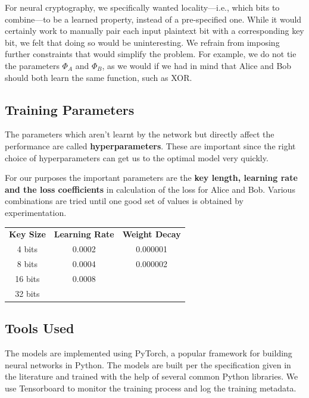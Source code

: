\documentclass[a4paper]{article}
\begin{document}
    For neural cryptography, we specifically wanted locality—i.e., which bits to combine—to
    be a learned property, instead of a pre-specified one. While it would certainly work to manually pair
    each input plaintext bit with a corresponding key bit, we felt that doing so would be uninteresting.
    We refrain from imposing further constraints that would simplify the problem. For example, we do
    not tie the parameters $\Phi_{A}$ and $\Phi_{B}$, as we would if we had in mind that Alice and Bob should both
    learn the same function, such as XOR.

    \subsection{Training Parameters}
    The parameters which aren't learnt by the network but directly affect the performance are
    called {\bfseries hyperparameters}. These are important since the right choice of hyperparameters
    can get us to the optimal model very quickly.

    For our purposes the important parameters are the {\bfseries key length, learning rate and the
    loss coefficients} in calculation of the loss for Alice and Bob. Various combinations are tried
    until one good set of values is obtained by experimentation.


    \begin{center}
      \begin{tabular}{ c|c|c }
        \textbf{Key Size} & \textbf{Learning Rate} & \textbf{Weight Decay} \\
        4 bits            & 0.0002                 & 0.000001              \\
        8 bits            & 0.0004                 & 0.000002              \\
        16 bits           & 0.0008                 &                       \\
        32 bits           &                        &                       \\
      \end{tabular}
    \end{center}

    \subsection{Tools Used}
    The models are implemented using PyTorch, a popular framework for building
    neural networks in Python. The models are built per the specification given in
    the literature and trained with the help of several common Python libraries.
    We use Tensorboard to monitor the training process and log the training metadata.
\end{document}
